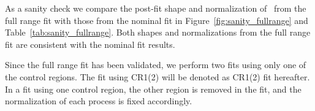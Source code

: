 As a sanity check we compare the post-fit shape and normalization of \qqww\
from the full range fit with those from the nominal fit in 
Figure~\ref{fig:sanity_fullrange} and Table~\ref{tab:sanity_fullrange}. 
Both shapes and normalizations from the full range fit 
are consistent with the nominal fit results. 

Since the full range fit has been validated, 
we perform two fits using only one of the control regions.
The fit using CR1(2) will be denoted as CR1(2) fit hereafter. 
In a fit using one control region, 
the other region is removed in the fit, and the normalization of each process 
is fixed accordingly. 

\begin{figure}[!hbtp]
\centering
{}
\\
\subfigure[\mT\ in CR2]{
\centering
\label{subfig:cr2_mT}
}
\end{figure}
